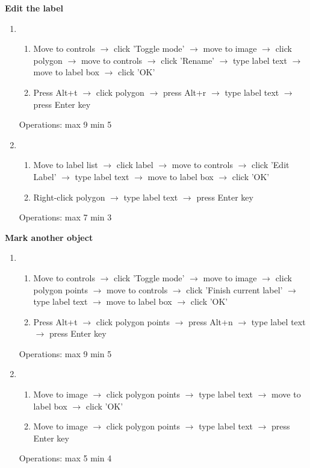 \documentclass[a4paper,11pt,oneside]{article}
\begin{document}
{\bf Edit the label}
\begin{enumerate}
    \item
    \begin{enumerate}
        \item Move to controls $\rightarrow$ click 'Toggle mode' $\rightarrow$ move to image $\rightarrow$ click polygon $\rightarrow$ move to controls $\rightarrow$ click 'Rename' $\rightarrow$ type label text $\rightarrow$ move to label box $\rightarrow$ click 'OK'
        \item Press Alt+t $\rightarrow$ click polygon $\rightarrow$ press Alt+r $\rightarrow$ type label text $\rightarrow$ press Enter key
    \end{enumerate}
    Operations: max 9 min 5
    \item
    \begin{enumerate}
        \item Move to label list $\rightarrow$ click label $\rightarrow$ move to controls $\rightarrow$ click 'Edit Label' $\rightarrow$ type label text $\rightarrow$ move to label box $\rightarrow$ click 'OK'
        \item Right-click polygon $\rightarrow$ type label text $\rightarrow$ press Enter key
    \end{enumerate}
    Operations: max 7 min 3
\end{enumerate}

{\bf Mark another object}
\begin{enumerate}
    \item
    \begin{enumerate}
        \item Move to controls $\rightarrow$ click 'Toggle mode' $\rightarrow$ move to image $\rightarrow$ click polygon points $\rightarrow$ move to controls $\rightarrow$ click 'Finish current label' $\rightarrow$ type label text $\rightarrow$ move to label box $\rightarrow$ click 'OK'
        \item Press Alt+t $\rightarrow$ click polygon points $\rightarrow$ press Alt+n $\rightarrow$ type label text $\rightarrow$ press Enter key
    \end{enumerate}
    Operations: max 9 min 5
    \item
    \begin{enumerate}
        \item Move to image $\rightarrow$ click polygon points $\rightarrow$ type label text $\rightarrow$ move to label box $\rightarrow$ click 'OK'
        \item Move to image $\rightarrow$ click polygon points $\rightarrow$ type label text $\rightarrow$ press Enter key
    \end{enumerate}
    Operations: max 5 min 4
\end{enumerate}
\end{document}
